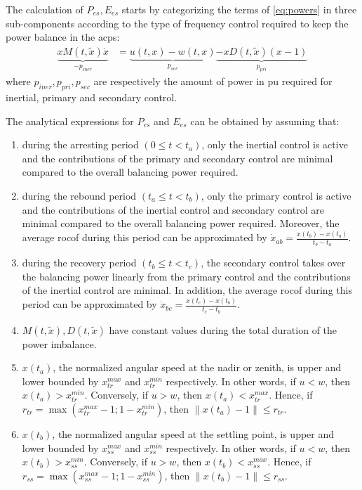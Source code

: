 \documentclass[utf8]{frontiersSCNS} %
\begin{document}
The calculation of $P_{es}, E_{es}$ starts by categorizing the terms of \cref{eq:powers} in three sub-components according to the type of frequency control required to keep the power balance in the \gls{acps}:
\begin{align}\label{eq:comp-powers}
 	\underbrace{x M (t,\widetilde{x}) \dot{x}}_{-p_{iner}} &= \underbrace{u(t,x) - w(t,x)}_{p_{sec}} \underbrace{- x D(t,\widetilde{x}) (x - 1)}_{p_{pri}}
\end{align}
where $p_{iner}, p_{pri}, p_{sec}$ are respectively the amount of power in pu required for inertial, primary and secondary control. 

The analytical expressions for $P_{es}$ and $E_{es}$ can be obtained by assuming that:

\begin{enumerate}%
    \item during the arresting period $ (0 \le t < t_a) $, only the inertial control is active and the contributions of the primary and secondary control are minimal compared to the overall balancing power required. 
    
    \item during the rebound period $ (t_a \le t < t_b) $, only the primary control is active and the contributions of the inertial control and secondary control are minimal compared to the overall balancing power required. Moreover, the average \gls{rocof} during this period can be approximated by $ \dot{x}_{ab} = \frac{x(t_b) - x(t_a)}{t_b - t_a} $.
    
    \item during the recovery period $ (t_b \le t < t_c) $, the secondary control takes over the balancing power linearly from the primary control and the contributions of the inertial control are minimal. In addition, the average \gls{rocof} during this period can be approximated by $ \dot{x}_{bc} = \frac{x(t_c) - x(t_b)}{t_c - t_b} $.
    
    \item $M(t,\widetilde{x}), D(t,\widetilde{x})$ have constant values during the total duration of the power imbalance.
    
    \item $x(t_a)$, the normalized angular speed at the nadir or zenith, is upper and lower bounded by $ x_{tr}^{max}$ and $x_{tr}^{min}$ respectively. In other words, if $u < w$, then $x(t_a) > x_{tr}^{min}$. Conversely, if $u > w$, then $x(t_a) < x_{tr}^{max}$. Hence, if $ r_{tr} = \max( x_{tr}^{max} - 1; 1 - x_{tr}^{min}) $, then $ \rVert x(t_a) - 1 \lVert \le r_{tr} $.
    
    \item $x(t_b)$, the normalized angular speed at the settling point, is upper and lower bounded by $ x_{ss}^{max}$ and $x_{ss}^{min}$ respectively. In other words, if $u < w$, then $x(t_b) > x_{ss}^{min}$. Conversely, if $u > w$, then $x(t_b) < x_{ss}^{max}$. Hence, if $ r_{ss} = \max( x_{ss}^{max} - 1; 1 - x_{ss}^{min}) $, then $  \rVert x(t_b) - 1 \lVert \le r_{ss} $.
\end{enumerate}
\end{document}
